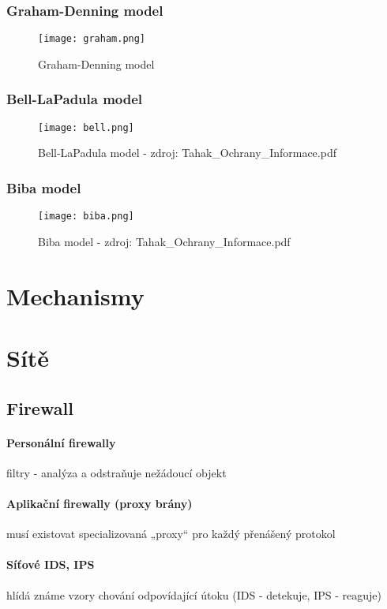 \documentclass[10pt,a4paper]{article}
\begin{document}
\subsubsection*{Graham-Denning model}
\begin{figure}[ht]
    \texttt{[image: graham.png]}
    \caption{Graham-Denning model}
\end{figure}

\subsubsection*{Bell-LaPadula model}
\begin{figure}[ht]
    \texttt{[image: bell.png]}
    \caption{Bell-LaPadula model - zdroj: Tahak\_Ochrany\_Informace.pdf}
\end{figure}

\subsubsection*{Biba model}
\begin{figure}[ht]
    \texttt{[image: biba.png]}
    \caption{Biba model - zdroj: Tahak\_Ochrany\_Informace.pdf}
\end{figure}

\section{Mechanismy}
\section{Sítě}

\subsection*{Firewall}

\paragraph*{Personální firewally} filtry - analýza a odstraňuje nežádoucí objekt

\paragraph*{Aplikační firewally (proxy brány)} musí existovat specializovaná „proxy“ pro každý přenášený protokol

\paragraph*{Síťové IDS, IPS} hlídá známe vzory chování odpovídající útoku (IDS - detekuje, IPS - reaguje)
\end{document}
